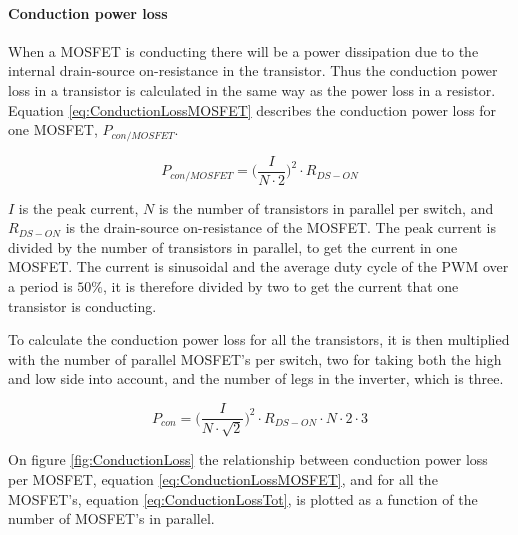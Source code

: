 \paragraph{Conduction power loss}
When a MOSFET is conducting there will be a power dissipation due to the internal drain-source on-resistance in the transistor. Thus the conduction power loss in a transistor is calculated in the same way as the power loss in a resistor. Equation \ref{eq:ConductionLossMOSFET} describes the conduction power loss for one MOSFET, $P_{con/MOSFET}$.

    \begin{equation}
        P_{con/MOSFET} = \bigg( \frac{I}{N \cdot 2} \bigg) ^2 \cdot R_{DS-ON}
        \label{eq:ConductionLossMOSFET}
    \end{equation}

$I$ is the peak current, $N$ is the number of transistors in parallel per switch, and $R_{DS-ON}$ is the drain-source on-resistance of the MOSFET.
The peak current is divided by the number of transistors in parallel, to get the current in one MOSFET. The current is sinusoidal and the average duty cycle of the PWM over a period is $50 \% $, it is therefore divided by two to get the current that one transistor is conducting.

To calculate the conduction power loss for all the transistors, it is then multiplied with the number of parallel MOSFET's per switch, two for taking both the high and low side into account, and the number of legs in the inverter, which is three.

    \begin{equation}
        P_{con} = \bigg( \frac{I}{N \cdot \sqrt{2}} \bigg) ^2 \cdot R_{DS-ON} \cdot N \cdot 2 \cdot 3
        \label{eq:ConductionLossTot}
    \end{equation}

On figure \ref{fig:ConductionLoss} the relationship between conduction power loss per MOSFET, equation \ref{eq:ConductionLossMOSFET}, and for all the MOSFET's, equation \ref{eq:ConductionLossTot}, is plotted as a function of the number of MOSFET's in parallel. 

